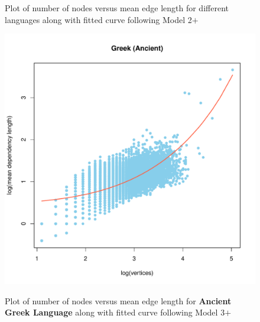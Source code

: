 \documentclass[a4paper]{article}
\begin{document}
\begin{figure}[hbtp]
	\caption{Plot of number of nodes versus mean edge length for different languages along with fitted curve following Model 2$+$}
	
\end{figure}


\begin{figure}[hbtp]
	\centering
	\includegraphics[scale=0.38]{Greek_Ancient}
	\label{Ancient Greek Language}
	\caption{Plot of number of nodes versus mean edge length for \textbf{Ancient Greek Language} along with fitted curve following Model 3$+$}
\end{figure}
\end{document}
